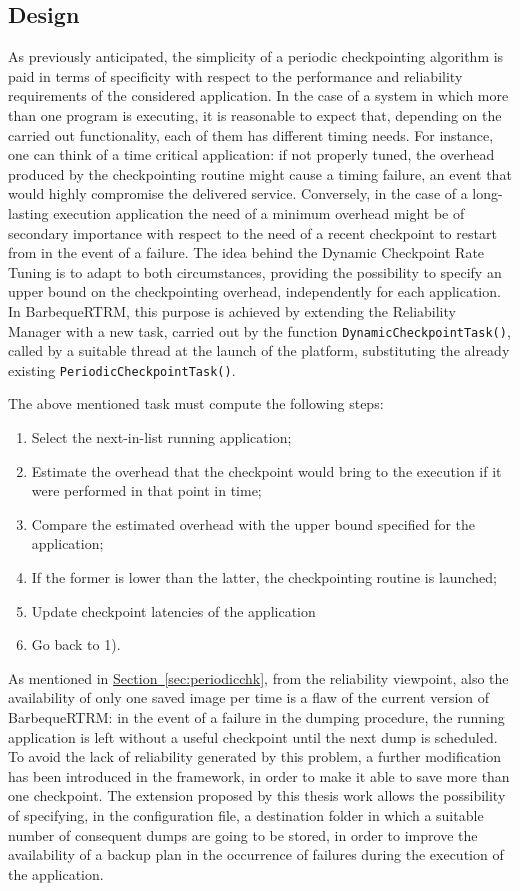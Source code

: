 \subsection{Design}
As previously anticipated, the simplicity of a periodic checkpointing algorithm is paid in terms of specificity with respect to the performance and reliability requirements of the considered application. In the case of a system in which more than one program is executing, it is reasonable to expect that, depending on the carried out functionality, each of them has different timing needs. For instance, one can think of a time critical application: if not properly tuned, the overhead produced by the checkpointing routine might cause a timing failure, an event that would highly compromise the delivered service. Conversely, in the case of a long-lasting execution application the need of a minimum overhead might be of secondary importance with respect to the need of a recent checkpoint to restart from in the event of a failure. The idea behind the Dynamic Checkpoint Rate Tuning is to adapt to both circumstances, providing the possibility to specify an upper bound on the checkpointing overhead, independently for each application. In BarbequeRTRM, this purpose is achieved by extending the Reliability Manager with a new task, carried out by the function \verb|DynamicCheckpointTask()|, called by a suitable thread at the launch of the platform, substituting the already existing \verb|PeriodicCheckpointTask()|. 

The above mentioned task must compute the following steps:
\begin{enumerate}[label={\arabic*)}]
    \item Select the next-in-list running application;
    \item Estimate the overhead that the checkpoint would bring to the execution if it were performed in that point in time;
    \item Compare the estimated overhead with the upper bound specified for the application;
    \item If the former is lower than the latter, the checkpointing routine is launched;
    \item Update checkpoint latencies of the application
    \item Go back to 1).
\end{enumerate}
As mentioned in {\hyperref[sec:periodicchk]{Section~\ref{sec:periodicchk}}}, from the reliability viewpoint, also the availability of only one saved image per time is a flaw of the current version of BarbequeRTRM: in the event of a failure in the dumping procedure, the running application is left without a useful checkpoint until the next dump is scheduled. To avoid the lack of reliability generated by this problem, a further modification has been introduced in the framework, in order to make it able to save more than one checkpoint. The extension proposed by this thesis work allows the possibility of specifying, in the configuration file, a destination folder in which a suitable number of consequent dumps are going to be stored, in order to improve the availability of a backup plan in the occurrence of failures during the execution of the application.

